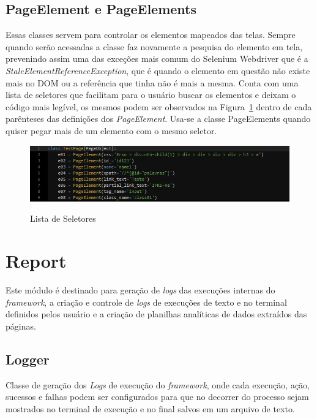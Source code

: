         \subsection{PageElement e PageElements}
        \label{PageElement}
            Essas classes servem para controlar os elementos mapeados das telas. Sempre quando serão acessadas a classe faz novamente a pesquisa
            do elemento em tela, prevenindo assim uma das exceções mais comum do Selenium Webdriver que é a \textit{StaleElementReferenceException},
            que é quando o elemento em questão não existe mais no DOM ou a referência que tinha não é mais a mesma. Conta com uma lista de seletores
            que facilitam para o usuário buscar os elementos e deixam o código mais legível, os mesmos podem ser observados na Figura~\ref{fig:selectors}
            dentro de cada parênteses das definições dos \textit{PageElement}.
            Usa-se a classe PageElements quando quiser pegar mais de um elemento com o mesmo seletor.

            \begin{figure}[H]
                \vspace*{0,3cm}
                \centering
                \caption{Lista de Seletores}
                \includegraphics[width=1\textwidth]{./04-figuras/selectors}
                \label{fig:selectors}
            \end{figure}



    \section{Report}

        Este módulo é destinado para geração de \textit{logs} das execuções internas do \textit{framework}, a criação e controle
        de \textit{logs} de execuções de texto e no terminal definidos pelos usuário e a criação de planilhas analíticas de dados extraídos das páginas.

        \subsection{Logger}
        Classe de geração dos \textit{Logs} de execução do \textit{framework}, onde cada execução, ação, sucessos e falhas podem ser configurados para que no
        decorrer do processo sejam mostrados no terminal de execução e no final salvos em um arquivo de texto.

